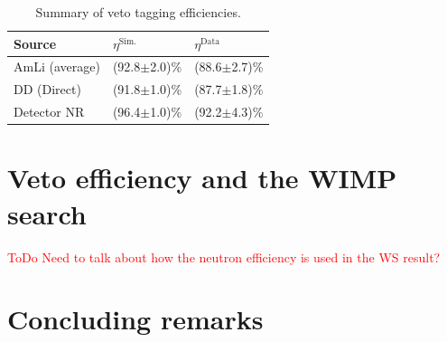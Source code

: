 \begin{table}[!ht]
	\centering
	\caption[Summary of veto tagging efficiencies.]{Summary of veto tagging efficiencies.}
	\begin{tabular}{lll}
    \hline\hline
    \textbf{Source}& \textbf{$\eta^\text{Sim.}$}& \textbf{$\eta^\text{Data}$}\\ 
    \hline
    AmLi (average) & (92.8$\pm$2.0)\% & (88.6$\pm$2.7)\% \\
    DD (Direct)    & (91.8$\pm$1.0)\% & (87.7$\pm$1.8)\% \\
    Detector NR    & (96.4$\pm$1.0)\% & (92.2$\pm$4.3)\%\\
    \hline\hline
	\end{tabular}
	\label{tab:VetoEff/final_veto_efficiency}
\end{table}


\section{Veto efficiency and the WIMP search}\label{sec:VetoEff4WIMPSearch}
\textcolor{red}{ToDo Need to talk about how the neutron efficiency is used in the WS result?}

\section{Concluding remarks}